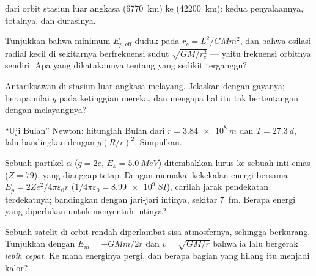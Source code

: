 \begin{exercise}[$\star\star$]\label{exo:b1:central-forces:7}
 dari orbit stasiun luar angkasa (\qty{6770}{km}) ke 
(\qty{42200}{km}): kedua penyalaannya, totalnya, dan durasinya.
\end{exercise}

\begin{exercise}[$\star\star$]\label{exo:b1:central-forces:8}
Tunjukkan bahwa minimum $E_{p,\mathrm{eff}}$ duduk pada $r_c = L^2/GMm^2$,
dan bahwa osilasi radial kecil di sekitarnya berfrekuensi sudut
$\sqrt{GM/r_c^3}$ --- yaitu frekuensi orbitnya sendiri. Apa yang
dikatakannya tentang  yang sedikit terganggu?
\end{exercise}

\begin{exercise}[$\star\star$]\label{exo:b1:central-forces:9}
Antariksawan di stasiun luar angkasa melayang. Jelaskan dengan gayanya; berapa nilai $g$
pada ketinggian mereka, dan mengapa hal itu tak bertentangan dengan
melayangnya?
\end{exercise}

\begin{exercise}[$\star\star\star$]\label{exo:b1:central-forces:10}
``Uji Bulan'' Newton: hitunglah  Bulan dari
$r = \qty{3.84e8}{m}$ dan $T = \qty{27.3}{d}$, lalu bandingkan dengan
$g(R/r)^2$. Simpulkan.
\end{exercise}

\begin{exercise}[$\star\star\star$]\label{exo:b1:central-forces:11}
Sebuah partikel $\alpha$ ($q = 2e$, $E_k = \qty{5.0}{MeV}$) ditembakkan
lurus ke sebuah inti emas ($Z = 79$), yang dianggap tetap. Dengan
memakai kekekalan energi bersama $E_p = 2Ze^2/4\pi\varepsilon_0r$
($1/4\pi\varepsilon_0 = \qty{8.99e9}{SI}$), carilah jarak pendekatan
terdekatnya; bandingkan dengan jari-jari intinya, sekitar \qty{7}{fm}.
Berapa energi yang diperlukan untuk menyentuh intinya?
\end{exercise}

\begin{exercise}[$\star\star\star$]\label{exo:b1:central-forces:12}
Sebuah satelit di orbit rendah diperlambat sisa atmosfernya, sehingga
 berkurang. Tunjukkan dengan $E_m = -GMm/2r$ dan
$v = \sqrt{GM/r}$ bahwa ia lalu bergerak \emph{lebih cepat}. Ke mana
energinya pergi, dan berapa bagian  yang hilang itu
menjadi kalor?
\end{exercise}

